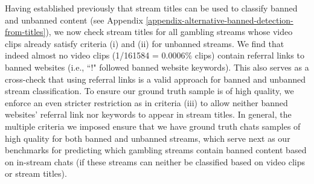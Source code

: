 \documentclass[a4paper,12pt]{article}
\begin{document}
Having established previously that stream titles can be used to classify banned and unbanned content (see Appendix \ref{appendix-alternative-banned-detection-from-titles}), we now check stream titles for all gambling streams whose video clips already satisfy criteria (i) and (ii) for unbanned streams. We find that indeed almost no video clips (1/161584 =  0.0006$\%$ clips) contain referral links to banned websites (i.e., ``!" followed banned website keywords). This also serves as a cross-check that using referral links is a valid approach for banned and unbanned stream classification. To ensure our ground truth sample is of high quality, we enforce an even stricter restriction as in criteria (iii) to allow neither banned websites' referral link nor keywords to appear in stream titles. In general, the multiple criteria we imposed ensure that we have ground truth chats samples of high quality for both banned and unbanned streams, which serve next as our benchmarks for predicting which gambling streams contain banned content based on in-stream chats (if these streams can neither be classified based on video clips or stream titles). 


\end{document}
